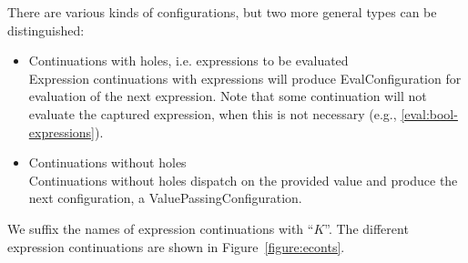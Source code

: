 \documentclass{article}
\begin{document}
There are various kinds of configurations, but two more general types can be distinguished:
\begin{itemize}
\item Continuations with holes, i.e. expressions to be evaluated\\
Expression continuations with expressions will produce EvalConfiguration for evaluation of the next expression.
Note that some continuation will not evaluate the captured expression, when this is not necessary (e.g., \ref{eval:bool-expressions}).

\item Continuations without holes\\
Continuations without holes dispatch on the provided value and produce the next configuration, a ValuePassingConfiguration.
\end{itemize}
We suffix the names of expression continuations with ``$K$''.
The different expression continuations are shown in Figure~\ref{figure:econts}.
%
\newcommand{\ExceptionHandlersRest}{\handler,\,\cstrace,\,\cex}
\newcommand{\ExceptionHandlers}{\strace,\,\handler,\,\cstrace,\,\cex}
\newcommand{\VarSetK}[3]{\mathrm{VarSetK}({#1},\,{#2},\,{#3})}
\newcommand{\ExpressionsK}[3]{\mathrm{ExpressionsK}({#1},\,{#2},\,\ExceptionHandlers,\,{#3})}
%
\newcommand{\NotK}[1]{\mathrm{NotK}({#1})}
\newcommand{\AndK}[3]{\mathrm{AndK}({#1},\,{#2},\,\ExceptionHandlers,\,{#3})}
\newcommand{\OrK}[3]{\mathrm{OrK}({#1},\,{#2},\,\ExceptionHandlers,\,{#3})}
\newcommand{\ConditionalK}[4]{\mathrm{ConditionalK}({#1},\,{#2},\,{#3},\,\ExceptionHandlers,\,{#4})}
%
\newcommand{\LetK}[4]{\mathrm{LetK}({#1},\,{#2},\,{#3},\,\ExceptionHandlers,\,{#4})}
%
\newcommand{\IsExpressionK}{\mathrm{IsExpressionK}(\tt{T},\,\econt)}
\newcommand{\AsExpressionK}{\mathrm{AsExpressionK}(\tt{T},\,\strace,\,\handler,\,\econt)}
%
\newcommand{\StaticGetK}{\mathrm{StaticGetK}(\membermeta,\,\econt)}
\newcommand{\StaticSetK}{\mathrm{StaticSetK}(\membermeta,\,\econt)}
\newcommand{\PropertyGetK}{\mathrm{PropertyGetK}(\idmeta,\,\ExceptionHandlers,\,\econt)}
\newcommand{\PropertySetK}{\mathrm{PropertySetK}(\idmeta,\,\expressionmeta_1,\,\env,\,\ExceptionHandlers,\,\econt)}
\newcommand{\PropertySetVK}{\mathrm{PropertySetValueK}(\val_0,\,\idmeta,\,\ExceptionHandlers,\,\econt)}
\newcommand{\DPropertyGetK}{\mathrm{DPropertyGetK}(\membermeta,\,\ExceptionHandlers,\,\econt)}
\newcommand{\DirectPropertySetK}{\mathrm{DPropertySetK}(\membermeta,\,\expressionmeta_1,\,\env,\,\ExceptionHandlers,\,\econt)}
\newcommand{\DPropertySetVK}{\mathrm{DPropertySetValueK}(\val_0,\,\membermeta,\,\ExceptionHandlers,\,\econt)}
\end{document}
